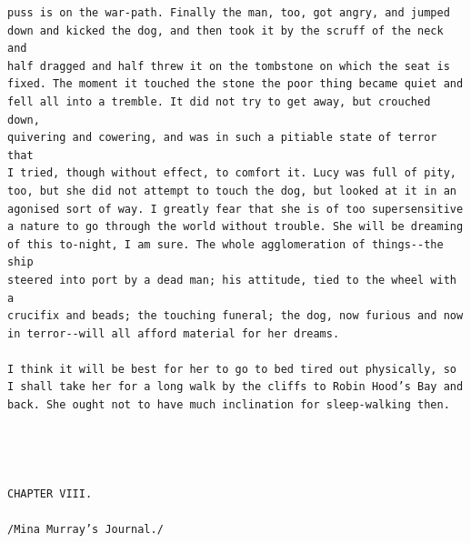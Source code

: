 \documentclass{article}
\begin{document}
\begin{verbatim}
puss is on the war-path. Finally the man, too, got angry, and jumped
down and kicked the dog, and then took it by the scruff of the neck and
half dragged and half threw it on the tombstone on which the seat is
fixed. The moment it touched the stone the poor thing became quiet and
fell all into a tremble. It did not try to get away, but crouched down,
quivering and cowering, and was in such a pitiable state of terror that
I tried, though without effect, to comfort it. Lucy was full of pity,
too, but she did not attempt to touch the dog, but looked at it in an
agonised sort of way. I greatly fear that she is of too supersensitive
a nature to go through the world without trouble. She will be dreaming
of this to-night, I am sure. The whole agglomeration of things--the ship
steered into port by a dead man; his attitude, tied to the wheel with a
crucifix and beads; the touching funeral; the dog, now furious and now
in terror--will all afford material for her dreams.

I think it will be best for her to go to bed tired out physically, so
I shall take her for a long walk by the cliffs to Robin Hood’s Bay and
back. She ought not to have much inclination for sleep-walking then.




CHAPTER VIII.

/Mina Murray’s Journal./



\end{verbatim}
\end{document}
